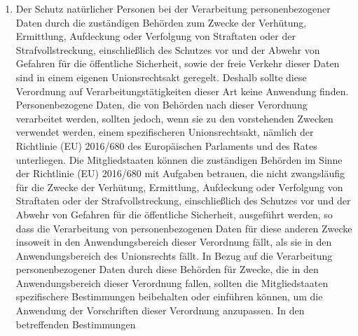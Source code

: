 \begin{enumerate}
   \item Der Schutz natürlicher Personen bei der Verarbeitung personenbezogener Daten durch die zuständigen Behörden zum
    Zwecke der Verhütung, Ermittlung, Aufdeckung oder Verfolgung von Straftaten oder der Strafvollstreckung,
    einschließlich des Schutzes vor und der Abwehr von Gefahren für die öffentliche Sicherheit, sowie der freie Verkehr
    dieser Daten sind in einem eigenen Unionsrechtsakt geregelt. Deshalb sollte diese Verordnung auf
    Verarbeitungstätigkeiten dieser Art keine Anwendung finden. Personenbezogene Daten, die von Behörden nach dieser
    Verordnung verarbeitet werden, sollten jedoch, wenn sie zu den vorstehenden Zwecken verwendet werden, einem
    spezifischeren Unionsrechtsakt, nämlich der Richtlinie (EU) 2016/680 des Europäischen Parlaments und des
    Rates
    unterliegen. Die Mitgliedstaaten können die zuständigen Behörden im Sinne der Richtlinie (EU) 2016/680 mit Aufgaben
    betrauen, die nicht zwangsläufig für die Zwecke der Verhütung, Ermittlung, Aufdeckung oder Verfolgung von
    Straftaten oder der Strafvollstreckung, einschließlich des Schutzes vor und der Abwehr von Gefahren für die
    öffentliche Sicherheit, ausgeführt werden, so dass die Verarbeitung von personenbezogenen Daten für diese anderen
    Zwecke insoweit in den Anwendungsbereich dieser Verordnung fällt, als sie in den Anwendungsbereich des Unionsrechts
    fällt. In Bezug auf die Verarbeitung personenbezogener Daten durch diese Behörden für Zwecke, die in den
    Anwendungsbereich dieser Verordnung fallen, sollten die Mitgliedstaaten spezifischere Bestimmungen beibehalten oder
    einführen können, um die Anwendung der Vorschriften dieser Verordnung anzupassen. In den betreffenden Bestimmungen

\end{enumerate}
